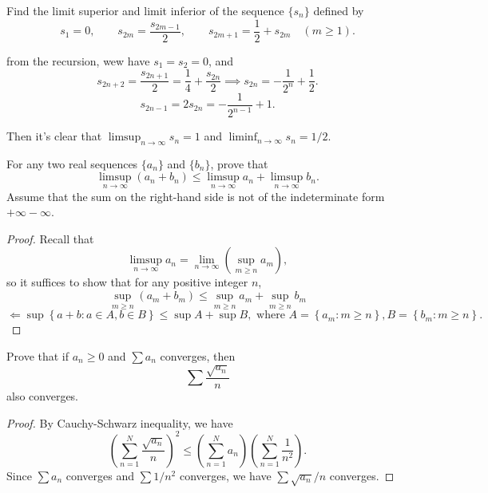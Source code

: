 \documentclass{article}
\begin{document}
\begin{problem}[3-4]
Find the limit superior and limit inferior of the sequence $\{s_n\}$ defined by
\[
s_1=0,\qquad s_{2m}=\frac{s_{2m-1}}{2},\qquad s_{2m+1}=\frac{1}{2}+s_{2m}\quad(m\ge 1).
\]
\end{problem}

\begin{solution}
  from the recursion, wew have \( s_1=s_2=0 \), and
  \[ s_{2n+2}=\frac{s_{2n+1}}{2}=\frac{1}{4}+\frac{s_{2n}}{2} \implies s_{2n}=-\frac{1}{2^{n}}+\frac{1}{2}.\]
  \[ s_{2n-1}=2s_{2n}=-\frac{1}{2^{n-1}}+1. \]\par
  Then it's clear that \( \limsup_{n\to\infty} s_n=1 \) and \( \liminf_{n\to\infty} s_n=1/2 \).  
\end{solution}

\begin{problem}[3-5]
For any two real sequences $\{a_n\}$ and $\{b_n\}$, prove that
\[
\limsup_{n\to\infty}(a_n+b_n)\le \limsup_{n\to\infty}a_n+\limsup_{n\to\infty}b_n.
\]
Assume that the sum on the right-hand side is not of the indeterminate form $+\infty-\infty$.
\end{problem}

\begin{proof}
  Recall that 
  \[ \limsup_{n\to\infty}a_n=\lim_{n\to\infty}\left(\sup_{m\ge n} a_m\right), \]
  so it suffices to show that for any positive integer \( n \),
  \[ \sup_{m\ge n} (a_m+b_m)\le \sup_{m\ge n} a_m+\sup_{m\ge n} b_m \] 
  \[ \Longleftarrow \sup \left\{a+b:a\in A,b\in B\right\}\le \sup A+\sup B,\text{ where }A=\left\{a_m:m\ge n\right\},B=\left\{b_m:m\ge n\right\}. \] 
\end{proof}


\begin{problem}[3-7]
Prove that if $a_n\ge 0$ and $\sum a_n$ converges, then
\[
\sum \frac{\sqrt{a_n}}{n}
\]
also converges.
\end{problem}

\begin{proof}
  By Cauchy-Schwarz inequality, we have
  \[ \left(\sum_{n=1}^N \frac{\sqrt{a_n}}{n}\right)^2\le \left(\sum_{n=1}^N a_n\right)\left(\sum_{n=1}^N \frac{1}{n^2}\right). \] 
  Since \( \sum a_n \) converges and \( \sum 1/n^2 \) converges, we have \( \sum {\sqrt{a_n}}/{n} \) converges.
\end{proof}
\end{document}
